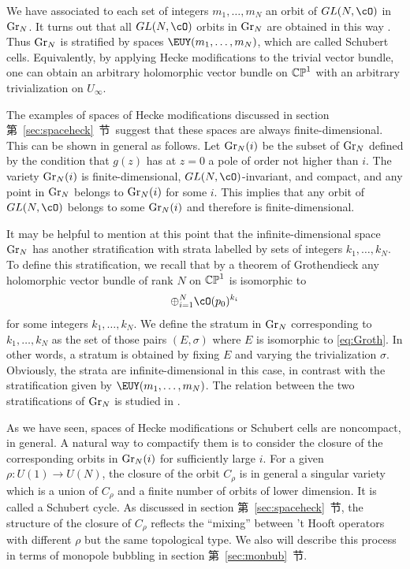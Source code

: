 We have associated to each set of integers $m_1,\ldots,m_N$ an
orbit of $GL(N,\cO)$ in ${\rm Gr}_N$. It turns out that all
$GL(N,\cO)$ orbits in ${\rm Gr}_N$ are obtained in this way \cite{ref122} .
Thus ${\rm Gr}_N$ is stratified by spaces
${{\EUY}}(m_1,\ldots,m_N)$, which are called Schubert cells.
Equivalently, by applying Hecke modifications to the trivial
vector bundle, one can obtain an arbitrary holomorphic vector
bundle on $\Bbb{CP}^1$ with an arbitrary trivialization on
$U_\infty$.

The examples of spaces of Hecke modifications discussed in section
第~\ref{sec:spaceheck}~节\ suggest that these spaces are always
finite-dimensional. This can be shown in general as follows. Let
${\rm Gr}_N(i)$ be the subset of ${\rm Gr}_N$ defined by the
condition that $g(z)$ has at $z=0$ a pole of order not higher than
$i$. The variety ${\rm Gr}_N(i)$ is finite-dimensional,
$GL(N,\cO)$-invariant, and compact, and any point in ${\rm Gr}_N$
belongs to ${\rm Gr}_N(i)$ for some $i$. This implies that any
orbit of $GL(N,\cO)$ belongs to some ${\rm Gr}_N(i)$ and therefore
is finite-dimensional.

It may be helpful to mention at this point that the
infinite-dimensional space ${\rm Gr}_N$ has another stratification
with strata labelled by sets of integers $k_1,\ldots,k_N$. To
define this stratification, we recall that by a theorem of
Grothendieck any holomorphic vector bundle of rank $N$ on
$\Bbb{CP}^1$ is isomorphic to %
\setcounter{equation}{32}
\begin{equation}\label{eq:Groth}
\oplus_{i=1}^N
\cO(p_0)^{k_i}
\end{equation}
 for some integers $k_1,\ldots,k_N$. We define the
stratum in ${\rm Gr}_N$ corresponding to $k_1,\ldots,k_N$ as the
set of those pairs $(E,\sigma)$ where $E$ is isomorphic to \eqref{eq:Groth}.
In other words, a stratum is obtained by fixing $E$ and varying
the trivialization $\sigma$. Obviously, the strata are
infinite-dimensional in this case, in contrast with the
stratification given by ${{\EUY}}(m_1,\ldots,m_N)$. The relation
between the two stratifications of ${\rm Gr}_N$ is studied in \cite{ref122}.

As we have seen, spaces of Hecke modifications or Schubert cells
are noncompact, in general. A natural way to compactify them is to
consider the closure of the corresponding orbits in ${\rm
Gr}_N(i)$ for sufficiently large $i$. For a given $\rho: U(1)\to
U(N)$, the closure of the orbit $C_\rho$ is in general a singular
variety which  is a union of $C_\rho$ and a finite number of
orbits of lower dimension. It is called a Schubert cycle.  As
discussed in section 第~\ref{sec:spaceheck}~节, the structure of the closure of
$C_\rho$ reflects the ``mixing'' between 't Hooft operators with
different $\rho$ but the same topological type.  We also will
describe this process in terms of monopole bubbling in section
第~\ref{sec:monbub}~节.

